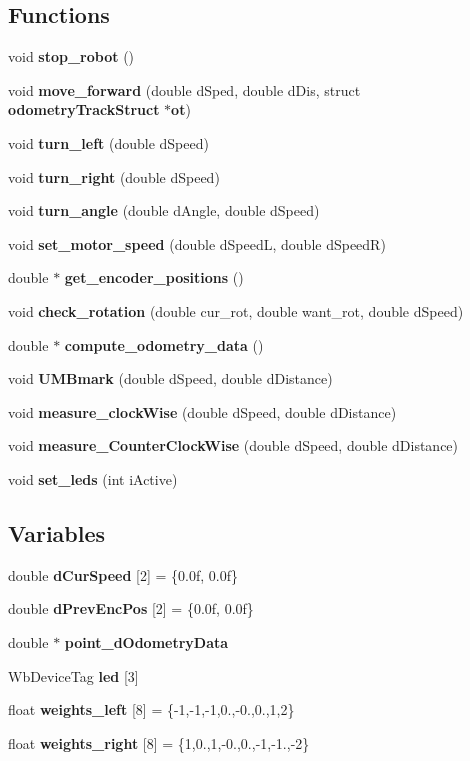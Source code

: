 \subsection*{Functions}
\begin{DoxyCompactItemize}
\item 
void {\bf stop\-\_\-robot} ()
\item 
void {\bf move\-\_\-forward} (double d\-Sped, double d\-Dis, struct {\bf odometry\-Track\-Struct} $\ast${\bf ot})
\item 
void {\bf turn\-\_\-left} (double d\-Speed)
\item 
void {\bf turn\-\_\-right} (double d\-Speed)
\item 
void {\bf turn\-\_\-angle} (double d\-Angle, double d\-Speed)
\item 
void {\bf set\-\_\-motor\-\_\-speed} (double d\-Speed\-L, double d\-Speed\-R)
\item 
double $\ast$ {\bf get\-\_\-encoder\-\_\-positions} ()
\item 
void {\bf check\-\_\-rotation} (double cur\-\_\-rot, double want\-\_\-rot, double d\-Speed)
\item 
double $\ast$ {\bf compute\-\_\-odometry\-\_\-data} ()
\item 
void {\bf U\-M\-Bmark} (double d\-Speed, double d\-Distance)
\item 
void {\bf measure\-\_\-clock\-Wise} (double d\-Speed, double d\-Distance)
\item 
void {\bf measure\-\_\-\-Counter\-Clock\-Wise} (double d\-Speed, double d\-Distance)
\item 
void {\bf set\-\_\-leds} (int i\-Active)
\end{DoxyCompactItemize}
\subsection*{Variables}
\begin{DoxyCompactItemize}
\item 
double {\bf d\-Cur\-Speed} [2] = \{0.\-0f, 0.\-0f\}
\item 
double {\bf d\-Prev\-Enc\-Pos} [2] = \{0.\-0f, 0.\-0f\}
\item 
double $\ast$ {\bf point\-\_\-d\-Odometry\-Data}
\item 
Wb\-Device\-Tag {\bf led} [3]
\item 
float {\bf weights\-\_\-left} [8] = \{-\/1,-\/1,-\/1,0.,-\/0.,0.,1,2\}
\item 
float {\bf weights\-\_\-right} [8] = \{1,0.,1,-\/0.,0.,-\/1,-\/1.,-\/2\}
\end{DoxyCompactItemize}


